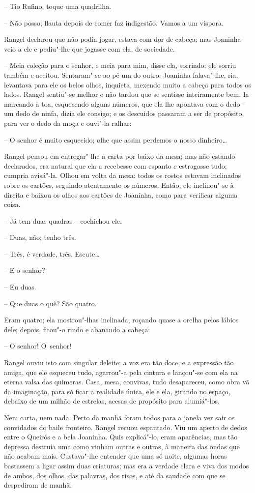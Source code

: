 -- Tio Rufino, toque uma quadrilha.

-- Não posso; flauta depois de comer faz indigestão. Vamos a um víspora.

Rangel declarou que não podia jogar, estava com dor de cabeça; mas
Joaninha veio a ele e pediu"-lhe que jogasse com ela, de sociedade.

-- Meia coleção para o senhor, e meia para mim, disse ela, sorrindo; ele
sorriu também e aceitou. Sentaram"-se ao pé um do outro. Joaninha
falava"-lhe, ria, levantava para ele os belos olhos, inquieta, mexendo
muito a cabeça para todos os lados. Rangel sentiu"-se melhor e não tardou
que se sentisse inteiramente bem. Ia marcando à toa, esquecendo alguns
números, que ela lhe apontava com o dedo -- um dedo de ninfa, dizia ele
consigo; e os descuidos passaram a ser de propósito, para ver o dedo da
moça e ouvi"-la ralhar:

-- O senhor é muito esquecido; olhe que assim perdemos o nosso
dinheiro\ldots{}

Rangel pensou em entregar"-lhe a carta por baixo da mesa; mas não estando
declarados, era natural que ela a recebesse com espanto e estragasse
tudo; cumpria avisá"-la. Olhou em volta da mesa: todos os rostos estavam
inclinados sobre os cartões, seguindo atentamente os números. Então, ele
inclinou"-se à direita e baixou os olhos aos cartões de Joaninha, como
para verificar alguma coisa.

-- Já tem duas quadras -- cochichou ele.

-- Duas, não; tenho três.

-- Três, é verdade, três. Escute\ldots{}

-- E o senhor?

-- Eu duas.

-- Que duas o quê? São quatro.

Eram quatro; ela mostrou"-lhas inclinada, roçando quase a orelha pelos
lábios dele; depois, fitou"-o rindo e abanando a cabeça:

-- O senhor! O~senhor!

Rangel ouviu isto com singular deleite; a voz era tão doce, e a
expressão tão amiga, que ele esqueceu tudo, agarrou"-a pela cintura e
lançou"-se com ela na eterna valsa das quimeras. Casa, mesa, convivas,
tudo desapareceu, como obra vã da imaginação, para só ficar a realidade
única, ele e ela, girando no espaço, debaixo de um milhão de estrelas,
acesas de propósito para alumiá"-los.

Nem carta, nem nada. Perto da manhã foram todos para a janela ver sair
os convidados do baile fronteiro. Rangel recuou espantado. Viu um aperto
de dedos entre o Queirós e a bela Joaninha. Quis explicá"-lo, eram
aparências, mas tão depressa destruía uma como vinham outras e outras, à
maneira das ondas que não acabam mais. Custava"-lhe entender que uma só
noite, algumas horas bastassem a ligar assim duas criaturas; mas era a
verdade clara e viva dos modos de ambos, dos olhos, das palavras, dos
risos, e até da saudade com que se despediram de manhã.

